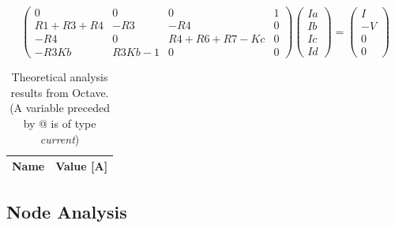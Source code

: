 \begin{equation}
\begin{pmatrix}
0 & 0 & 0 & 1 \\
R1+R3+R4 & -R3 & -R4 & 0 \\
-R4 & 0 & R4+R6+R7-Kc & 0 \\
-R3Kb & R3Kb-1 & 0 & 0
\end{pmatrix}
\begin{pmatrix}
Ia\\
Ib\\
Ic\\
Id
\end{pmatrix}
=
\begin{pmatrix}
I\\
-V\\
0\\
0
\end{pmatrix}
\end{equation}



\begin{table}[h]
  \centering
  \begin{tabular}{|l|r|}
    \hline    
    {\bf Name} & {\bf Value [A]} \\ \hline
     
  \end{tabular}
  \caption{Theoretical analysis results from Octave. (A variable preceded by @ is of type {\em current})}
  \label{tab:mesh}
\end{table}

\subsection{Node Analysis}

